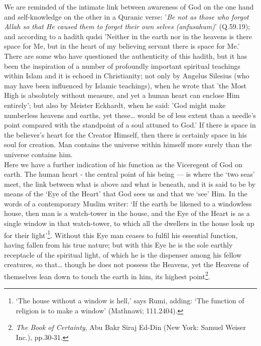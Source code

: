\documentclass[10pt, twoside,openright]{book}
\begin{document}
We are reminded of the intimate link between awareness of God on the one hand and self\hyp{}knowledge on 
the other in a Quranic verse: '\emph{Be not as those who forgot Allah so that He caused them to forget 
their own selves (anfusahum)}' (Q.59.19); and according to a hadith qudsi 'Neither in the earth nor in 
the heavens is there space for Me, but in the heart of my believing servant there is space for Me.' 
There are some who have questioned the authenticity of this hadith, but it has been the inspiration 
of a number of profoundly important spiritual teachings within Islam and it is echoed in 
Christianity; not only by Angelus Silesius (who may have been influenced by Islamic teachings), when 
he wrote that 'the Most High is absolutely without measure, and yet a human heart can enclose Him 
entirely'; but also by Meister Eckhardt, when he said: 'God might make numberless heavens and earths, 
yet these\ldots{} would be of less extent than a needle's point compared with the standpoint of a soul 
attuned to God.' If there is space in the believer's heart for the Creator Himself, then there is 
certainly space in his soul for creation. Man contains the universe within himself more surely than 
the universe contains him. \\

Here we have a further indication of his function as the Viceregent of God on earth. The human heart 
- the central point of his being --- is where the `two seas' meet, the link between what is above and 
what is beneath, and it is said to be by means of the `Eye of the Heart' that God sees us and that we 
`see' Him. In the words of a contemporary Muslim writer: `If the earth be likened to a windowless 
house, then man is a watch\hyp{}tower in the house, and the Eye of the Heart is as a single window in that 
watch\hyp{}tower, to which all the dwellers in the house look up for their light'\footnote{`The house without a window is hell,' says Rumi, adding: `The function of religion is to make a 
window' (Mathnawi; 111.2404).}. Without this Eye man 
ceases to fulfil his essential function, having fallen from his true nature; but with this Eye he is 
the sole earthly receptacle of the spiritual light, of which he is the dispenser among his fellow 
creatures, so that\ldots{} though he does not possess the Heavens, yet the Heavens of themselves lean 
down to touch the earth in him, its highest point\footnote{\emph{The Book of Certainty}, Abu Bakr Siraj Ed\hyp{}Din (New York: Samuel Weiser Inc.), pp.30-31.}. \\
\end{document}
